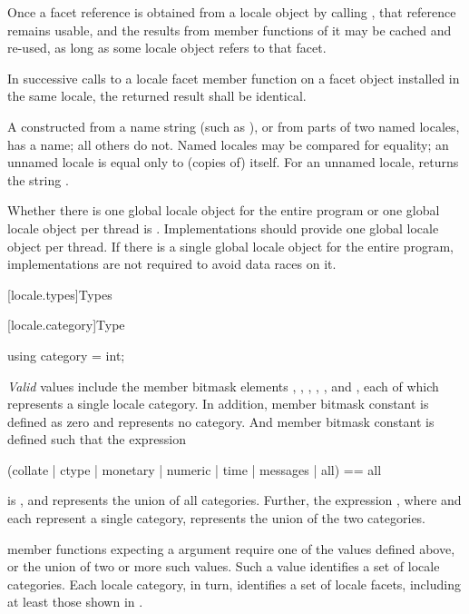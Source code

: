 \pnum
Once a facet reference is obtained from a locale object
by calling ,
that reference remains usable,
and the results from member functions of it may be cached and re-used,
as long as some locale object refers to that facet.

\pnum
In successive calls to a locale facet member function
on a facet object installed in the same locale,
the returned result shall be identical.

\pnum
A  constructed
from a name string (such as ), or
from parts of two named locales, has a name;
all others do not.
Named locales may be compared for equality;
an unnamed locale is equal only to (copies of) itself.
For an unnamed locale,  returns the string .

\pnum
Whether there is
one global locale object for the entire program or
one global locale object per thread
is .
Implementations should provide one global locale object per thread.
If there is a single global locale object for the entire program,
implementations are not required to
avoid data races on it.

[locale.types]{Types}

[locale.category]{Type }

%
\begin{itemdecl}
using category = int;
\end{itemdecl}

\pnum
\textit{Valid}  values
include the  member bitmask elements
,
,
,
,
,
and
,
each of which represents a single locale category.
In addition,  member bitmask constant 
is defined as zero and represents no category.
And  member bitmask constant 
is defined such that the expression
\begin{codeblock}
(collate | ctype | monetary | numeric | time | messages | all) == all
\end{codeblock}
is ,
and represents the union of all categories.
Further, the expression ,
where  and  each represent a single category,
represents the union of the two categories.

\pnum
{} member functions
expecting a  argument
require one of the  values defined above, or
the union of two or more such values.
Such a  value identifies a set of locale categories.
Each locale category, in turn, identifies a set of locale facets,
including at least those shown in .

